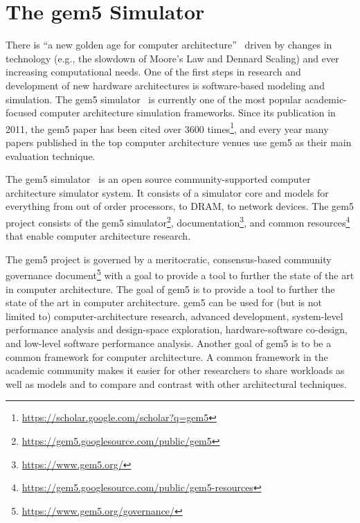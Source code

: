 

\section{The gem5 Simulator}

There is ``a new golden age for computer architecture''~\cite{turinglecture,cacm} driven by changes in technology (e.g., the slowdown of Moore's Law and Dennard Scaling) and ever increasing computational needs.
One of the first steps in research and development of new hardware architectures is software-based modeling and simulation.
The gem5 simulator~\cite{Binkert-gem5-2011} is currently one of the most popular academic-focused computer architecture simulation frameworks.
Since its publication in 2011, the gem5 paper has been cited over 3600 times\footnote{\url{https://scholar.google.com/scholar?q=gem5}}, and every year many papers published in the top computer architecture venues use gem5 as their main evaluation technique.

The gem5 simulator~\cite{Binkert-gem5-2011} is an open source community-supported computer architecture simulator system.
It consists of a simulator core and models for everything from out of order processors, to DRAM, to network devices.
The gem5 project consists of the gem5 simulator\footnote{\url{https://gem5.googlesource.com/public/gem5}}, documentation\footnote{\url{https://www.gem5.org/}}, and common resources\footnote{\url{https://gem5.googlesource.com/public/gem5-resources}} that enable computer architecture research.

The gem5 project is governed by a meritocratic, consensus-based community governance document\footnote{\url{https://www.gem5.org/governance/}} with a goal to provide a tool to further the state of the art in computer architecture.
The goal of gem5 is to provide a tool to further the state of the art in computer architecture. gem5 can be used for (but is not limited to) computer-architecture research, advanced development, system-level performance analysis and design-space exploration, hardware-software co-design, and low-level software performance analysis.
Another goal of gem5 is to be a common framework for computer architecture.
A common framework in the academic community makes it easier for other researchers to share workloads as well as models and to compare and contrast with other architectural techniques.

